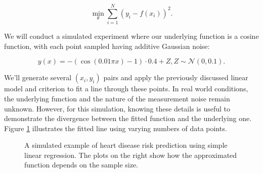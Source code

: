 \begin{equation}
	\min_{\theta} \sum_{i=1}^N (y_i - f(x_i))^2.
\end{equation}

We will conduct a simulated experiment where our underlying function is a cosine function, with each point sampled having additive Gaussian noise:

\begin{equation}
	y(x) = -(\cos(0.01 \pi x) - 1) \cdot 0.4 + Z, Z \sim \mathcal{N}(0, 0.1).
\end{equation}

We'll generate several $(x_i, y_i)$ pairs and apply the previously discussed linear model and criterion to fit a line through these points. In real world conditions, the underlying function and the nature of the measurement noise remain unknown. However, for this simulation, knowing these details is useful to demonstrate the divergence between the fitted function and the underlying one. Figure \ref{fig:t1-t2-example} illustrates the fitted line using varying numbers of data points.

\begin{figure}[h!]
 \hfill
 \hfill
 \hfill
 \caption{A simulated example of heart disease risk prediction using simple linear regression. The plots on the right show how the approximated function depends on the sample size.\label{fig:t1-t2-example}}
\end{figure}

